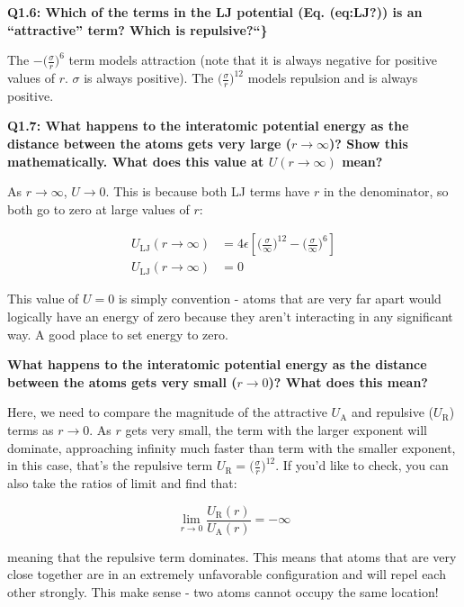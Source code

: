 \documentclass{book}
\begin{document}
\textbf{Q1.6: Which of the terms in the LJ potential (Eq. (\textbf{eq:LJ?}))
is an ``attractive'' term? Which is repulsive?{}``\}}

The \(-\Big(\frac{\sigma}{r}\Big)^6\) term models attraction (note that it is
always negative for positive values of \(r\). \(\sigma\) is always positive).
The \(\Big(\frac{\sigma}{r}\Big)^{12}\) models repulsion and is always
positive.

\textbf{Q1.7: What happens to the interatomic potential energy as the distance
between the atoms gets very large (\(r \rightarrow \infty\))? Show this
mathematically. What does this value at \(U(r \rightarrow \infty)\) mean?}

As \(r \rightarrow \infty\), \(U \rightarrow 0\). This is because both LJ
terms have \(r\) in the denominator, so both go to zero at large values of
\(r\):

\begin{align*}   U_{\text{LJ}}(r \rightarrow \infty) &= 4 \epsilon \left[\Big(\frac{\sigma}{\infty}\Big)^{12}-\Big(\frac{\sigma}{\infty}\Big)^6\right]\\    U_{\text{LJ}}(r \rightarrow \infty) &= 0 \end{align*}

This value of \(U = 0\) is simply convention - atoms that are very far apart
would logically have an energy of zero because they aren't interacting in any
significant way. A good place to set energy to zero.

\textbf{What happens to the interatomic potential energy as the distance
between the atoms gets very small (\(r \rightarrow 0\))? What does this mean?}

Here, we need to compare the magnitude of the attractive \(U_{\text{A}}\) and
repulsive (\(U_{\text{R}}\)) terms as \(r \rightarrow 0\). As \(r\) gets very
small, the term with the larger exponent will dominate, approaching infinity
much faster than term with the smaller exponent, in this case, that's the
repulsive term \(U_{\text{R}} = \Big(\frac{\sigma}{r}\Big)^{12}\). If you'd
like to check, you can also take the ratios of limit and find that:

\begin{equation}   \lim_{r\rightarrow0} \frac{U_{\text{R}}(r)}{U_{\text{A}}(r)} = -\infty \end{equation}

meaning that the repulsive term dominates. This means that atoms that are very
close together are in an extremely unfavorable configuration and will repel
each other strongly. This make sense - two atoms cannot occupy the same
location!
\end{document}
